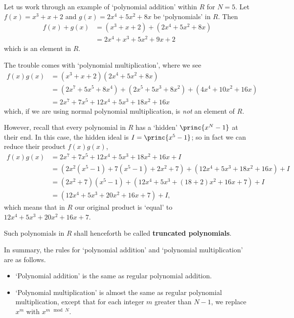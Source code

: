 \begin{example}
    Let us work through an example of `polynomial addition' within $R$ for $N = 5$. Let $f(x) = x^3 + x + 2$ and $g(x) = 2x^4 + 5x^2 + 8x$ be `polynomials' in $R$. Then
    \begin{align*}
        f(x) + g(x) &= (x^3 + x + 2) + (2x^4 + 5x^2 + 8x)\\
        &= 2x^4 + x^3 + 5x^2 + 9x + 2
    \end{align*}
    which is an element in $R$.
    
    The trouble comes with `polynomial multiplication', where we see
    \begin{align*}
        f(x)g(x) &= (x^3 + x + 2)(2x^4 + 5x^2 + 8x)\\
        &= (2x^7 + 5x^5 + 8x^4) + (2x^5 + 5x^3 + 8x^2) + (4x^4 + 10x^2 + 16x)\\
        &= 2x^7 + 7x^5 + 12x^4 + 5x^3 + 18x^2 + 16x
    \end{align*}
    which, if we are using normal polynomial multiplication, is \textit{not} an element of $R$.

    However, recall that every polynomial in $R$ has a `hidden' $\princ{x^N - 1}$ at their end. In this case, the hidden ideal is $I = \princ{x^5-1}$; so in fact we can reduce their product $f(x)g(x)$,
    \begin{align*}
        f(x)g(x) &= 2x^7 + 7x^5 + 12x^4 + 5x^3 + 18x^2 + 16x + I\\
        &= (2x^2(x^5-1) + 7(x^5-1) + 2x^2 + 7) + (12x^4 + 5x^3 + 18x^2 + 16x) + I\\
        &= (2x^2+7)(x^5-1) + (12x^4 + 5x^3 + (18 + 2)x^2 + 16x + 7) + I\\
        &= (12x^4 + 5x^3 + 20x^2 + 16x + 7) + I,
    \end{align*}
    which means that in $R$ our original product is `equal' to $12x^4 + 5x^3 + 20x^2 + 16x + 7$.
\end{example}

Such polynomials in $R$ shall henceforth be called \textbf{truncated polynomials}.

In summary, the rules for `polynomial addition' and `polynomial multiplication' are as follows.
\begin{itemize}
    \item `Polynomial addition' is the same as regular polynomial addition.
    \item `Polynomial multiplication' is almost the same as regular polynomial multiplication, except that for each integer $m$ greater than $N - 1$, we replace $x^m$ with $x^{m \mod N}$.
\end{itemize}

